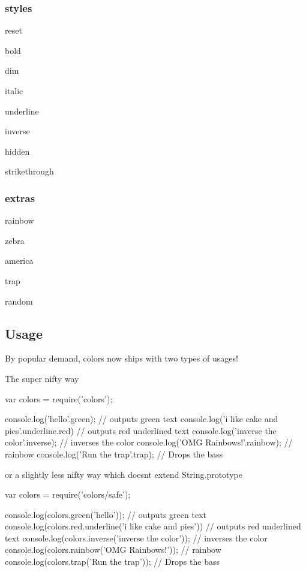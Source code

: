 \subsubsection*{styles}


\begin{DoxyItemize}
\item reset
\item bold
\item dim
\item italic
\item underline
\item inverse
\item hidden
\item strikethrough
\end{DoxyItemize}

\subsubsection*{extras}


\begin{DoxyItemize}
\item rainbow
\item zebra
\item america
\item trap
\item random
\end{DoxyItemize}

\subsection*{Usage}

By popular demand, {\ttfamily colors} now ships with two types of usages!

The super nifty way


\begin{DoxyCode}
var colors = require('colors');

console.log('hello'.green); // outputs green text
console.log('i like cake and pies'.underline.red) // outputs red underlined text
console.log('inverse the color'.inverse); // inverses the color
console.log('OMG Rainbows!'.rainbow); // rainbow
console.log('Run the trap'.trap); // Drops the bass
\end{DoxyCode}


or a slightly less nifty way which doesn\textquotesingle{}t extend {\ttfamily String.\+prototype}


\begin{DoxyCode}
var colors = require('colors/safe');

console.log(colors.green('hello')); // outputs green text
console.log(colors.red.underline('i like cake and pies')) // outputs red underlined text
console.log(colors.inverse('inverse the color')); // inverses the color
console.log(colors.rainbow('OMG Rainbows!')); // rainbow
console.log(colors.trap('Run the trap')); // Drops the bass
\end{DoxyCode}


